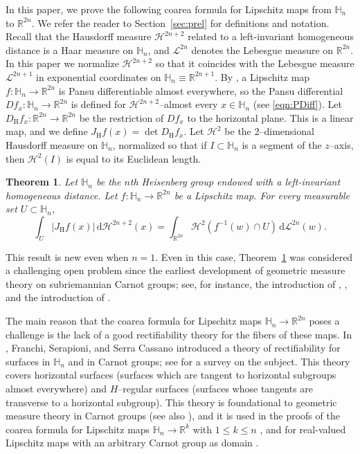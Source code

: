 \documentclass[12pt,reqno]{amsart}
\newcommand{\cH}{\mathcal{H}}
\newcommand{\JfH}{J_\mathrm{H}f}
\newcommand{\DfH}{D_\mathrm{H}f}
\newcommand{\HH}{\mathbb{H}}
\newcommand{\R}{\mathbb{R}}
\newcommand{\ud}[0]{\,\mathrm{d}}
\newcommand{\from}{\colon}
\newtheorem{thm}{Theorem}[section]
\theoremstyle{remark}
\newcommand{\0}{\mathbf{0}}
\renewcommand{\1}{\mathbf 1}
\begin{document}
In this paper, we prove the following coarea formula for Lipschitz maps from $\HH_n$ to $\R^{2n}$. We refer the reader to Section~\ref{sec:prel} for definitions and notation.
Recall that the Hausdorff measure $\mathcal{H}^{2n+2}$ related to a left-invariant homogeneous distance is a Haar measure on $\HH_n$, and $\mathcal{L}^{2n}$ denotes the Lebesgue measure on $\mathbb R^{2n}$. In this paper we normalize $\mathcal{H}^{2n+2}$ so that it coincides with the Lebesgue measure $\mathcal{L}^{2n+1}$ in exponential coordinates on $\HH_n\equiv \mathbb R^{2n+1}$. By \cite{Pansu, MagnaniPhD}, a Lipschitz map $f\from \HH_n\to\mathbb R^{2n}$ is Pansu differentiable almost everywhere, so the Pansu differential $Df_x\from \HH_n\to \R^{2n}$ is defined for $\cH^{2n+2}$--almost every $x\in \HH_n$  (see \eqref{eqn:PDiff}). Let $\DfH_x \from \R^{2n}\to \R^{2n}$ be the restriction of $Df_x$ to the horizontal plane. This is a linear map, and we define $\JfH(x) = \det \DfH_x$. Let $\cH^2$ be the $2$--dimensional Hausdorff measure on $\HH_n$, normalized so that if $I\subset \HH_n$ is a segment of the $z$--axis, then $\cH^2(I)$ is equal to its Euclidean length. 
\begin{thm}\label{thmCoareaLip}
    Let $\HH_n$ be the $n$th Heisenberg group endowed with a left-invariant homogeneous distance. Let $f\from \HH_n\to\mathbb R^{2n}$ be a Lipschitz map. For every measurable set $U\subset\HH_n$,
    \[
    \int_U |\JfH(x)|\ud\mathcal{H}^{2n+2}(x) = \int_{\mathbb R^{2n}}\mathcal{H}^2(f^{-1}(w)\cap U) \ud\mathcal{L}^{2n}(w).
    \]
\end{thm}

This result is new even when $n=1$. Even in this case, Theorem~\ref{thmCoareaLip} was considered a challenging open problem since the earliest development of geometric measure theory on subriemannian Carnot groups; see, for instance, the introduction of \cite{MagnaniCoareaInequality}, \cite[Remark 1.5]{JNGV}, and the introduction of \cite{CorniReverse}. 

The main reason that the coarea formula for Lipschitz maps $\HH_n\to\mathbb R^{2n}$ poses a challenge is the lack of a good rectifiability theory for the fibers of these maps. 
In \cite{FSSCMathAnn, FSSCILip, FSIlip}, Franchi, Serapioni, and Serra Cassano introduced a theory of rectifiability for surfaces in $\HH_n$ and in Carnot groups; see \cite{PhDAntonelli} for a survey on the subject. This theory covers horizontal surfaces (surfaces which are tangent to horizontal subgroups almost everywhere) and $H$--regular surfaces (surfaces whose tangents are transverse to a horizontal subgroup). This theory is foundational to geometric measure theory in Carnot groups (see also \cite{AK00}), and it is used in the proofs of the coarea formula for Lipschitz maps $\HH_n\to \mathbb R^{k}$ with $1\leq k\leq n$ \cite[Theorem 1.1]{MagnaniAreaImpliesCoarea}, and for real-valued Lipschitz maps with an arbitrary Carnot group as domain \cite[Theorem 3.5]{MagnaniMathNachr}. 
\end{document}
